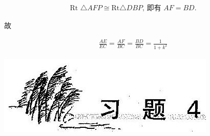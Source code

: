 \documentclass[10pt]{article}
\begin{document}
\begin{align*}
\text { Rt } \triangle A F P \cong \mathrm{Rt} \triangle D B P \text {, 即有 } A F=B D \text {. }
\end{align*}

故

\begin{align*}
\frac{A E}{E C}=\frac{A F}{B C}=\frac{B D}{B C}=\frac{1}{1+k^{2}}
\end{align*}

\begin{center}
\includegraphics[max width=\textwidth]{2024_10_30_2c8f45efd4a519b08e1ag-043(1)}
\end{center}
\end{document}
